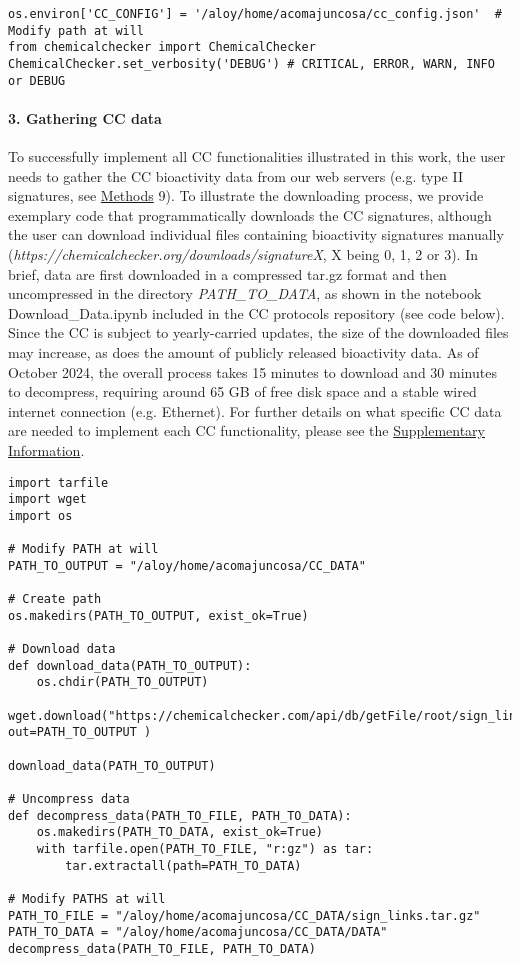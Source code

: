 \begin{lstlisting}
os.environ['CC_CONFIG'] = '/aloy/home/acomajuncosa/cc_config.json'  # Modify path at will
from chemicalchecker import ChemicalChecker
ChemicalChecker.set_verbosity('DEBUG') # CRITICAL, ERROR, WARN, INFO or DEBUG
\end{lstlisting}

\paragraph{3. Gathering CC data} \leavevmode

To successfully implement all CC functionalities illustrated in this work, the user needs to gather the CC bioactivity data from our web servers (e.g. type II signatures, see \hyperref[Protocols_Methods]{Methods} 9). To illustrate the downloading process, we provide exemplary code that programmatically downloads the CC signatures, although the user can download individual files containing bioactivity signatures manually (\textit{https://chemicalchecker.org/downloads/signatureX}, X being 0, 1, 2 or 3). In brief, data are first downloaded in a compressed tar.gz format and then uncompressed in the directory \textit{PATH\_TO\_DATA}, as shown in the notebook Download\_Data.ipynb included in the CC protocols repository (see code below). Since the CC is subject to yearly-carried updates, the size of the downloaded files may increase, as does the amount of publicly released bioactivity data. As of October 2024, the overall process takes 15 minutes to download and 30 minutes to decompress, requiring around 65 GB of free disk space and a stable wired internet connection (e.g. Ethernet). For further details on what specific CC data are needed to implement each CC functionality, please see the \hyperref[Supplementary_Protocols_DownloadingData]{Supplementary Information}.  \\

\begin{lstlisting}
import tarfile
import wget
import os

# Modify PATH at will
PATH_TO_OUTPUT = "/aloy/home/acomajuncosa/CC_DATA"

# Create path
os.makedirs(PATH_TO_OUTPUT, exist_ok=True)

# Download data
def download_data(PATH_TO_OUTPUT):
    os.chdir(PATH_TO_OUTPUT)
    wget.download("https://chemicalchecker.com/api/db/getFile/root/sign_links.tar.gz/", out=PATH_TO_OUTPUT )

download_data(PATH_TO_OUTPUT)

# Uncompress data
def decompress_data(PATH_TO_FILE, PATH_TO_DATA):
    os.makedirs(PATH_TO_DATA, exist_ok=True)
    with tarfile.open(PATH_TO_FILE, "r:gz") as tar:
        tar.extractall(path=PATH_TO_DATA)

# Modify PATHS at will
PATH_TO_FILE = "/aloy/home/acomajuncosa/CC_DATA/sign_links.tar.gz"
PATH_TO_DATA = "/aloy/home/acomajuncosa/CC_DATA/DATA"
decompress_data(PATH_TO_FILE, PATH_TO_DATA)
\end{lstlisting}

